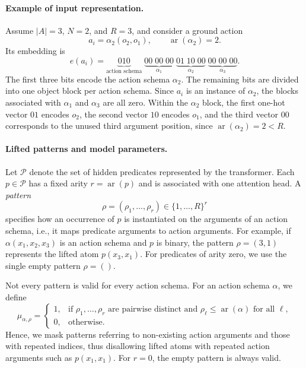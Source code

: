 \paragraph{Example of input representation.}
Assume $|A|=3$, $N=2$, and $R=3$, and consider a ground action
\[
a_i=\alpha_2(o_2,o_1),
\qquad
\operatorname{ar}(\alpha_2)=2.
\]
Its embedding is
\[
e(a_i)
=
\underbrace{010}_{\text{action schema}}
\;
\underbrace{00\;00\;00}_{\alpha_1}
\;
\underbrace{01\;10\;00}_{\alpha_2}
\;
\underbrace{00\;00\;00}_{\alpha_3}.
\]
The first three bits encode the action schema $\alpha_2$.
The remaining bits are divided into one object block per action schema.
Since $a_i$ is an instance of $\alpha_2$, the blocks associated with
$\alpha_1$ and $\alpha_3$ are all zero.
Within the $\alpha_2$ block, the first one-hot vector $01$ encodes
$o_2$, the second vector $10$ encodes $o_1$, and the third vector
$00$ corresponds to the unused third argument position, since
$\operatorname{ar}(\alpha_2)=2<R$.

\paragraph{Lifted patterns and model parameters.}
Let $\mathcal{P}$ denote the set of hidden predicates represented by the transformer.
Each $p\in\mathcal{P}$ has a fixed arity $r=\operatorname{ar}(p)$ and is associated with one attention head.
A \emph{pattern}
\begin{equation}
\rho = (\rho_1,\ldots,\rho_r) \in \{1,\ldots,R\}^{r}
\end{equation}
specifies how an occurrence of $p$ is instantiated on the arguments of an action schema, i.e., it maps predicate arguments to action arguments.
For example, if $\alpha(x_1,x_2,x_3)$ is an action schema and $p$ is binary, the pattern $\rho=(3,1)$ represents the lifted atom $p(x_3,x_1)$.
For predicates of arity zero, we use the single empty pattern $\rho=()$.

Not every pattern is valid for every action schema.
For an action schema $\alpha$, we define
\begin{equation}
\mu_{\alpha,\rho}
=
\begin{cases}
1, &
\text{if } \rho_1,\ldots,\rho_r \text{ are pairwise distinct and }
\rho_\ell \leq \operatorname{ar}(\alpha)
\text{ for all } \ell,\\
0, & \text{otherwise}.
\end{cases}
\label{eq:strips-pattern-mask}
\end{equation}
Hence, we mask patterns referring to non-existing action arguments and those with repeated indices, thus disallowing lifted atoms with repeated action arguments such as $p(x_1,x_1)$. For $r=0$, the empty pattern is always valid.

